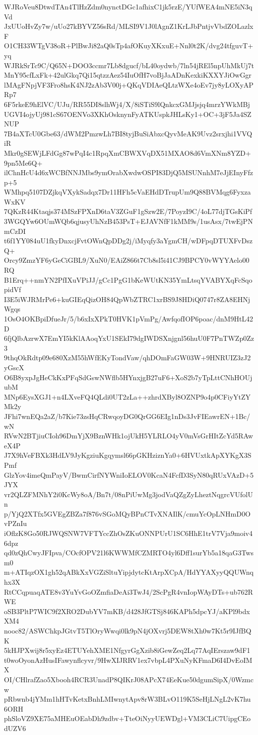 WJRoVeu8DtwdTAn4TlHzZdm0nynctDGc1afhixC1jk5rzE/YUfWEA4mNE5iN3qVd
JxUUoHvZy7w/uUo27kBYVZ56sRd/MLSI9V1J0lAgnZ1KrLJbPntjvVbdZOLazlxF
O1CH33WTgV38oR+PlBwJi82aQ0sTp4afOKuyXKxuE+Nnl0t2K/dvg24tfguvT+yq
WJRkSrTc9C/Q65N+DOO3ccmr7Lb8dgucf/bL40oydwb/7ln54jREl5npUhMkUj7t
MnY95cfLxFk+42ulGkq7Qi15qtzzAez54IuOfH7voBjJaADnKexkiKXXYJiOwGgr
lMAgFNpjVF3Fro8hsK4NJ2zAb3V00j+QKqVDIAeQLtzWXe4oEv7jy8yLOXyAPRp7
6F5rkeE9hElVC/UJu/RR55DI8slhWj4/X/8iSTiS9lQnkcxGMJjsjq4mrzYWkMBj
UGVI4ojyUj981cS67OENVo3XKhOsknynFyATKUspkJHLsKy1+OC+3jF5Ja4SZNUP
7B4aXTcU0Gbe63/dWM2PmzwLh7BI8tyjBuSiAbxcQyvMeAK9Uvz2srxjhi1VVQiR
Mkr0gSEWjLFdGg87wPqI4c1RpqXmCBWXVqDX51MXAO8d6VmXNm8YZD+9pn5Me6Q+
ilChnHcU4d6xWCBfNNJMbs9ymOrabXwdwOSPI83DjQ5MSUNnhM7eJjEInyFfzp+5
WMhpq5107DZjkqVXykSadqx7Dr11HFh5cVaEHdDTrupUm9Q88BVMqg6FyxzaWxKV
7QKzR44Ktaqjs374MSzFPXnD6taV3ZGuF1gSzw2E/7PoyzI9C/4oL77djTGsKiPf
3WGQYw6OUmWQb6qjusyUhNzB453PsT+EJAVNfF1kMM9s/1usAsx/7twEjPNmCzDI
t6f1YY084uU1fkyDnxcjFvtOWnQpDDg2j/iMyqfy3aYgmCH/wDFpqDTUXFvDszQ+
Orcy9ZmzYF6yGeCiGBL9/XuN0/EAiZ866t7Cb8sl5i41CJ9BPCY0vWYYAelo00RQ
B1Erq++nmYN2PfIXuVPiJJ/gCc1PgG1bKeWUtKN35YmLtsqYVABYXqFcSqopidVf
I3E5iWJRMrPe6+kuGIEqQizOH84QpWbZTRC1xrBS9J8HDiQ0747r8ZA8EHNjWgqs
1OsO4OKBpiDfueJr/5/b6xIxXPkT0HVK1pVmPg/AwfqofIOP6poac/dnM9HtL42D
6fjQlbAzrwX7EmYI5kKlAAoqYxU1SEkI79dgIWDSXnjgnl56huU0F7PnTWZp0Zz3
9thqOkRdtp09e680XzM55hWfEKyTondVaw/qhDOmFaGW03W+9HNRUIZ3zJ2yGscX
O6B8yxpJgHeCkKxPFqSdGswNWflb5HYnxjgB27uF6+XoS2b7yTpLttCNhHOUjubM
MNp6EysXGJ1+n4LXveFQ4QLdi0UT2zLa++zhrdXByl8OZNP9o4p0CFiyYtZYMk2y
JFhi7wnEQa2aZ/b7Kie73zsHqCRwqoyDG0QrGG6EIg1nDs3JvFIEawrEN+1Bc/wN
RVwN2BTjiuCIoh96DmYjX9BznWHk1ojUkH5YLRLO4yV0mVsGrHItZcYd5RAweX4P
J7X9hVeFBXk3HdLV9JyKgziuKgqymsl66pGKHziznYa0+6HVUxtkApXYKgX3SPmf
GlzYov4imeQmPayV/BwmCirfNYWniIoELOV0KcaN4FcfD3SyN80qRUxVAzD+5JYX
vr2QLZFMNhY2i0KcWy8oA/Bn7t/08nPiUwMg3jodVaQZgZyLheztNqgrcVUfolUn
p/YjQ2XTfx5GVEgZBZa7f876vSGoMQyBPnCTvXNAIlK/cmuYcOpLNHmD0OvPZnIu
iOflzK8Go50RJWQSNW7VFTYccZhOsZKuONNPUrU1SC6HhE1trV7Vja9moiv46dpz
qd0zQhCwyJFIpva/COcfOPV21l6KWWMfCZMRTO4yl6Dff1surYb5a18qaG3Twsm0
m+ATIqzOX1gh52qABkXxVGZiSltuYipjdytcKtArpXCpA/HdYYAXyyQQUWnqhx3X
RtCCqpuaqATE8v3YuYvGoOZmfiaDeAi3TwJ4/2ScPgR4vnIopWAyDTs+ub762RWE
oSB3PltP7WIC9f2XRO2DubYV7mKB/d428JfGTSj846KAPh5dpcYJ/aKPl9bdxXM4
nooc82/ASWChkpJGtvT5TlOryWwqi0lk9pN4jOXvrj5DEW8tXh0w7Kt5r9IJfBQK
5kHJPXwij8r5xyEz4ETUYehXME1NfgyrGgXzib8iGewZeq2Lq77AqIErszaw9dF1
t0woOyonAzHusIFawynflcyvr/9HwXIJRRV1ex7vbpL4PXuNyKFmaD6I4DvEoIMX
OI/CHlrafZao5Xbooh4RCR3UnadP8QIKrJ08APcX74EeKue50dgumSipX/0Wzmcw
pRbwnb4jYMm1hHTvKetxBnhLMIwnytApv8rW3BLvO119K5SeHjLNgL2vK7hu6ORH
phSloVZ9XE75aMHEuOEabDh9zdbv+TteOiNyyUEWDgl+VM3CLiC7UipgCEodUZV6
